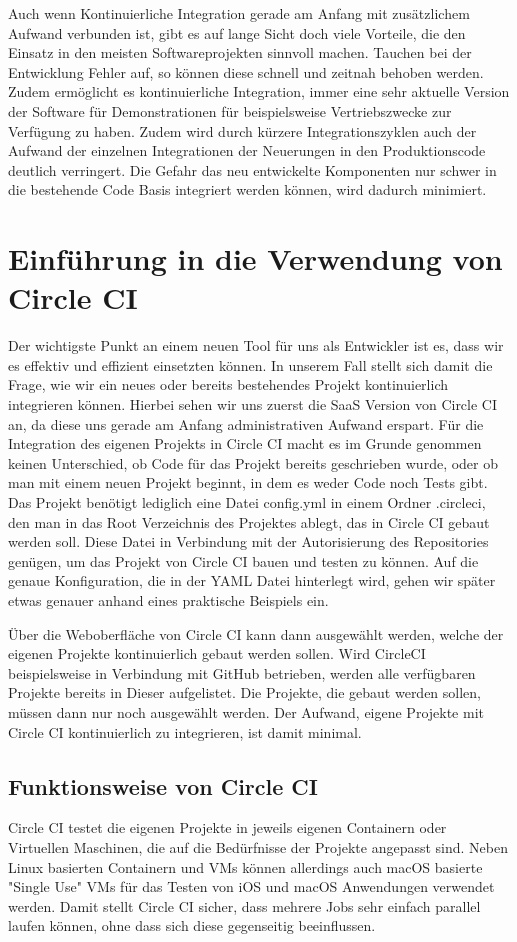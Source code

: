 \documentclass[11pt]{article}
\begin{document}
Auch wenn Kontinuierliche Integration gerade am Anfang mit zusätzlichem Aufwand verbunden ist, gibt es auf lange Sicht doch viele Vorteile, die den Einsatz in den meisten Softwareprojekten sinnvoll machen.
Tauchen bei der Entwicklung Fehler auf, so können diese schnell und zeitnah behoben werden.
Zudem ermöglicht es kontinuierliche Integration, immer eine sehr aktuelle Version der Software für Demonstrationen für beispielsweise Vertriebszwecke zur Verfügung zu haben. Zudem wird durch kürzere Integrationszyklen auch der Aufwand der einzelnen Integrationen der Neuerungen in den Produktionscode deutlich verringert.
Die Gefahr das neu entwickelte Komponenten nur schwer in die bestehende Code Basis integriert werden können, wird dadurch minimiert.

\section{Einführung in die Verwendung von Circle CI}
Der wichtigste Punkt an einem neuen Tool für uns als Entwickler ist es, dass wir es effektiv und effizient einsetzten können. In unserem Fall stellt sich damit die Frage, wie wir ein neues oder bereits bestehendes Projekt kontinuierlich integrieren können. Hierbei sehen wir uns zuerst die SaaS Version von Circle CI an, da diese uns gerade am Anfang administrativen Aufwand erspart. Für die Integration des eigenen Projekts in Circle CI macht es im Grunde genommen keinen Unterschied, ob Code für das Projekt bereits geschrieben wurde, oder ob man mit einem neuen Projekt beginnt, in dem es weder Code noch Tests gibt. Das Projekt benötigt lediglich eine Datei config.yml in einem Ordner .circleci, den man in das Root Verzeichnis des Projektes ablegt, das in Circle CI gebaut werden soll. Diese Datei in Verbindung mit der Autorisierung des Repositories genügen, um das Projekt von Circle CI bauen und testen zu können. Auf die genaue Konfiguration, die in der YAML Datei hinterlegt wird, gehen wir später etwas genauer anhand eines praktische Beispiels ein.

Über die Weboberfläche von Circle CI kann dann ausgewählt werden, welche der eigenen Projekte kontinuierlich gebaut werden sollen. Wird CircleCI beispielsweise in Verbindung mit GitHub betrieben, werden alle verfügbaren Projekte bereits in Dieser aufgelistet. Die Projekte, die gebaut werden sollen, müssen dann nur noch ausgewählt werden. Der Aufwand, eigene Projekte mit Circle CI kontinuierlich zu integrieren, ist damit minimal. 

\subsection{Funktionsweise von Circle CI}
Circle CI testet die eigenen Projekte in jeweils eigenen Containern oder Virtuellen Maschinen, die auf die Bedürfnisse der Projekte angepasst sind. Neben Linux basierten Containern und VMs können allerdings auch macOS basierte "Single Use" VMs für das Testen von iOS und macOS Anwendungen verwendet werden.
Damit stellt Circle CI sicher, dass mehrere Jobs sehr einfach parallel laufen können, ohne dass sich diese gegenseitig beeinflussen.
\end{document}
